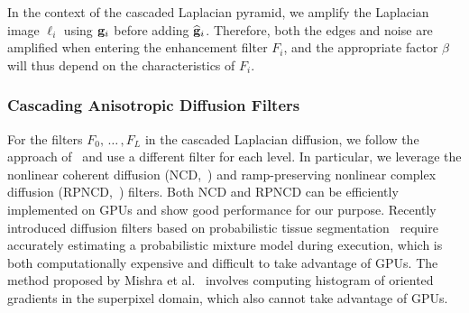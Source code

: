 In the context of the cascaded Laplacian pyramid, we amplify the Laplacian image \({\boldsymbol\ell}_i\) using \(\mathbf{g}_i\) before adding \(\widehat{\mathbf{g}}_i\).
Therefore, both the edges and noise are amplified when entering the enhancement filter \(F_i\), and the appropriate factor \(\beta\) will thus depend on the characteristics of \(F_i\).

\subsubsection{Cascading Anisotropic Diffusion Filters}
For the filters \(F_0,\,\ldots\,, F_L\) in the cascaded Laplacian diffusion, we follow the approach of~\cite{kang_new_2016} and use a different filter for each level.
In particular, we leverage the nonlinear coherent diffusion (NCD,~\cite{abd-elmoniem_realtime_2002}) and ramp-preserving nonlinear complex diffusion (RPNCD,~\cite{gilboa_image_2004}) filters.
Both NCD and RPNCD can be efficiently implemented on GPUs and show good performance for our purpose.
Recently introduced diffusion filters based on probabilistic tissue segmentation~\cite{hutchison_probabilisticdriven_2010, ramos-llorden_anisotropic_2015} require accurately estimating a probabilistic mixture model during execution, which is both computationally expensive and difficult to take advantage of GPUs.
The method proposed by Mishra et al.~\cite{mishra_edge_2018} involves computing histogram of oriented gradients in the superpixel domain, which also cannot take advantage of GPUs.
%
